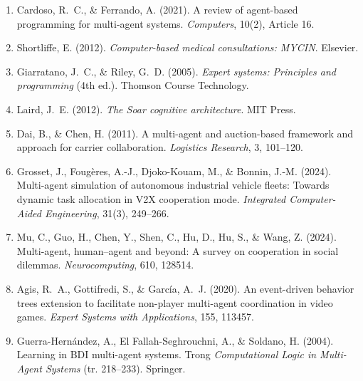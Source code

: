 \begin{enumerate}
\item
  Cardoso, R.~C., \& Ferrando, A. (2021). A review of agent-based programming for multi-agent systems. \emph{Computers}, 10(2), Article 16.

\item
  Shortliffe, E. (2012). \emph{Computer-based medical consultations: MYCIN}. Elsevier.

\item
  Giarratano, J.~C., \& Riley, G.~D. (2005). \emph{Expert systems: Principles and programming} (4th ed.). Thomson Course Technology.

\item
  Laird, J.~E. (2012). \emph{The Soar cognitive architecture}. MIT Press.

\item
  Dai, B., \& Chen, H. (2011). A multi-agent and auction-based framework and approach for carrier collaboration. \emph{Logistics Research}, 3, 101--120.

\item
  Grosset, J., Fougères, A.-J., Djoko-Kouam, M., \& Bonnin, J.-M. (2024). Multi-agent simulation of autonomous industrial vehicle fleets: Towards dynamic task allocation in V2X cooperation mode. \emph{Integrated Computer-Aided Engineering}, 31(3), 249--266.

\item
  Mu, C., Guo, H., Chen, Y., Shen, C., Hu, D., Hu, S., \& Wang, Z. (2024). Multi-agent, human--agent and beyond: A survey on cooperation in social dilemmas. \emph{Neurocomputing}, 610, 128514.

\item
  Agis, R.~A., Gottifredi, S., \& García, A.~J. (2020). An event-driven behavior trees extension to facilitate non-player multi-agent coordination in video games. \emph{Expert Systems with Applications}, 155, 113457.

\item
  Guerra-Hernández, A., El Fallah-Seghrouchni, A., \& Soldano, H. (2004). Learning in BDI multi-agent systems. Trong \emph{Computational Logic in Multi-Agent Systems} (tr. 218--233). Springer.

\end{enumerate}